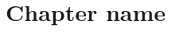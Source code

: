\documentclass[../../main.tex]{subfiles}
\begin{document}
\chapter{Chapter name}
\label{subfile_id:cha:name_of_chapter2}


\lipsum[1]
\end{document}

